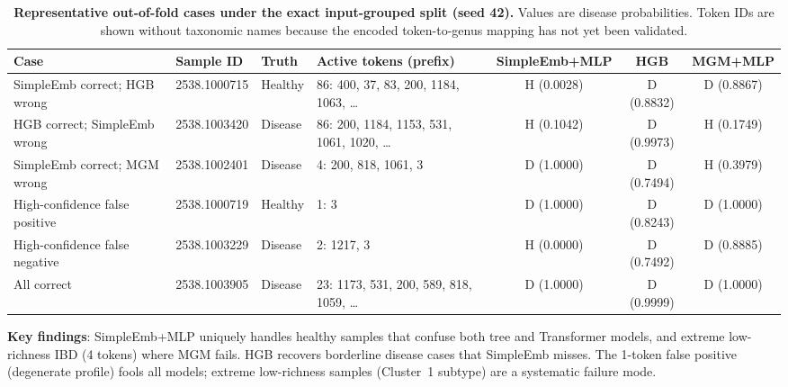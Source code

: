 \documentclass[11pt,a4paper]{article}
\begin{document}
\begin{table}[ht]
\centering
\caption{\textbf{Representative out-of-fold cases under the exact input-grouped split (seed 42).}
Values are disease probabilities. Token IDs are shown without taxonomic names because
the encoded token-to-genus mapping has not yet been validated.}
\label{tab:sup5}
\begin{tabular}{p{3.6cm}p{2.4cm}p{1.6cm}p{3.2cm}ccc}
\toprule
\textbf{Case} & \textbf{Sample ID} & \textbf{Truth} & \textbf{Active tokens (prefix)} & \textbf{SimpleEmb+MLP} & \textbf{HGB} & \textbf{MGM+MLP} \\
\midrule
SimpleEmb correct; HGB wrong & 2538.1000715 & Healthy & 86: 400, 37, 83, 200, 1184, 1063, \ldots & H (0.0028) & D (0.8832) & D (0.8867) \\
HGB correct; SimpleEmb wrong & 2538.1003420 & Disease & 86: 200, 1184, 1153, 531, 1061, 1020, \ldots & H (0.1042) & D (0.9973) & H (0.1749) \\
SimpleEmb correct; MGM wrong & 2538.1002401 & Disease & 4: 200, 818, 1061, 3 & D (1.0000) & D (0.7494) & H (0.3979) \\
High-confidence false positive & 2538.1000719 & Healthy & 1: 3 & D (1.0000) & D (0.8243) & D (1.0000) \\
High-confidence false negative & 2538.1003229 & Disease & 2: 1217, 3 & H (0.0000) & D (0.7492) & D (0.8885) \\
All correct & 2538.1003905 & Disease & 23: 1173, 531, 200, 589, 818, 1059, \ldots & D (1.0000) & D (0.9999) & D (1.0000) \\
\bottomrule
\end{tabular}
\end{table}

\textbf{Key findings}: SimpleEmb+MLP uniquely handles healthy samples that confuse both
tree and Transformer models, and extreme low-richness IBD (4 tokens) where MGM fails.
HGB recovers borderline disease cases that SimpleEmb misses. The 1-token false positive
(degenerate profile) fools all models; extreme low-richness samples (Cluster~1 subtype)
are a systematic failure mode.
\end{document}
